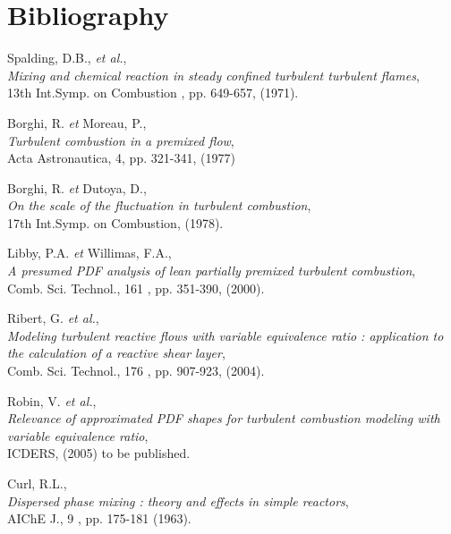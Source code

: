 \section{Bibliography}
\begin{thebibliography}{7}

{\sc Spalding, D.B., {\em et al.}},\\
{\em Mixing and chemical reaction in steady confined turbulent turbulent flames},\\
13th Int.Symp. on Combustion , pp. 649-657, (1971).

{\sc Borghi, R. {\em et } Moreau, P.},\\
{\em Turbulent combustion in a premixed flow},\\
Acta Astronautica, 4, pp. 321-341, (1977)

{\sc Borghi, R. {\em et } Dutoya, D.},\\
{\em On the scale of the fluctuation in turbulent combustion},\\
17th Int.Symp. on Combustion, (1978).

{\sc Libby, P.A. {\em et } Willimas, F.A.},\\
{\em A presumed PDF analysis of lean partially premixed turbulent combustion},\\
Comb. Sci. Technol., 161 , pp. 351-390, (2000).

{\sc Ribert, G. {\em et al.}},\\
{\em Modeling turbulent reactive flows with variable equivalence ratio : application to the calculation of a reactive shear layer},\\
Comb. Sci. Technol., 176 , pp. 907-923, (2004).

{\sc Robin, V. {\em et al.}},\\
{\em Relevance of approximated PDF shapes for turbulent combustion modeling with variable equivalence ratio},\\
ICDERS, (2005) to be published.

{\sc Curl, R.L.},\\
{\em Dispersed phase mixing : theory and effects in simple reactors},\\
AIChE J., 9 , pp. 175-181 (1963).




\end{thebibliography}
\newpage
